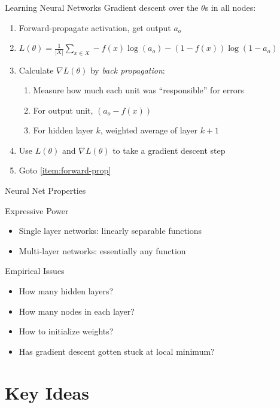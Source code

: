 \documentclass[14pt]{beamer}
\begin{document}
\begin{frame}[label=nn-learning]{Learning Neural Networks}
Gradient descent over the $\theta$s in all nodes:
\begin{enumerate}
\item\label{item:forward-prop} Forward-propagate activation, get output $a_o$
\item $\displaystyle L(\theta) = \frac{1}{|X|} \sum_{x \in X} -f(x) \log(a_o) - (1 - f(x)) \log(1 - a_o)$
\item Calculate $\displaystyle \nabla L(\theta)$ by \textit{back propagation}:
\begin{enumerate}
\item Measure how much each unit was ``responsible'' for errors
\item For output unit, $(a_o - f(x))$
\item For hidden layer $k$, weighted average of layer $k+1$
\end{enumerate}
\item Use $L(\theta)$ and $\nabla L(\theta)$ to take a gradient descent step
\item Goto \ref{item:forward-prop}
\end{enumerate}
\end{frame}

\begin{frame}[label=nn-properties]{Neural Net Properties}
\begin{block}{Expressive Power}
\begin{itemize}
\item Single layer networks: linearly separable functions
\item Multi-layer networks: essentially any function
\end{itemize}
\end{block}
\pause
\begin{block}{Empirical Issues}
\begin{itemize}
\item How many hidden layers?
\item How many nodes in each layer?
\item How to initialize weights?
\item Has gradient descent gotten stuck at local minimum?
\end{itemize}
\end{block}
\end{frame}

\part{Key Ideas}
\end{document}
